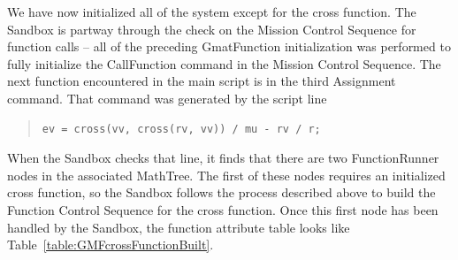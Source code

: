 We have now initialized all of the system except for the cross function.  The Sandbox is partway
through the check on the Mission Control Sequence for function calls -- all of the preceding
GmatFunction initialization was performed to fully initialize the CallFunction command in the
Mission Control Sequence.  The next function encountered in the main script is in the third
Assignment command.  That command was generated by the script line

\begin{quote}
\begin{verbatim}
ev = cross(vv, cross(rv, vv)) / mu - rv / r;
\end{verbatim}
\end{quote}

\noindent When the Sandbox checks that line, it finds that there are two FunctionRunner nodes in the
associated MathTree.  The first of these nodes requires an initialized cross function, so the
Sandbox follows the process described above to build the Function Control Sequence for the cross
function.  Once this first node has been handled by the Sandbox, the function attribute table looks
like Table~\ref{table:GMFcrossFunctionBuilt}.

